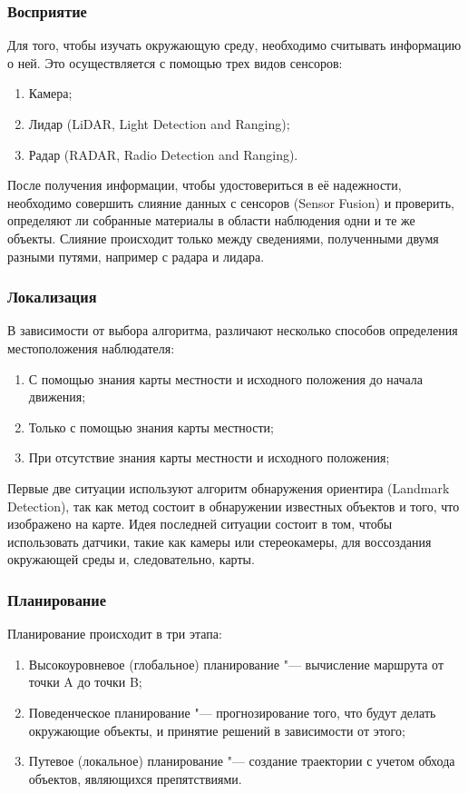 \documentclass[bachelor, och, coursework]{SCWorks}
\begin{document}
        \subsubsection{Восприятие}
            Для того, чтобы изучать окружающую среду, необходимо считывать информацию о ней. Это осуществляется с помощью трех видов сенсоров:
            \begin{enumerate}
                \item Камера;
                \item Лидар (LiDAR, Light Detection and Ranging);
                \item Радар (RADAR, Radio Detection and Ranging).
            \end{enumerate}
            После получения информации, чтобы удостовериться в её надежности, необходимо совершить слияние данных с сенсоров (Sensor Fusion) и проверить, определяют ли собранные материалы в области наблюдения одни и те же объекты. Слияние происходит только между сведениями, полученными двумя разными путями, например с радара и лидара.

        \subsubsection{Локализация}
            В зависимости от выбора алгоритма, различают несколько способов определения местоположения наблюдателя:
            \begin{enumerate}
                \item С помощью знания карты местности и исходного положения до начала движения;
                \item Только с помощью знания карты местности;
                \item При отсутствие знания карты местности и исходного положения;
            \end{enumerate}
            Первые две ситуации используют алгоритм обнаружения ориентира (Landmark Detection), так как метод состоит в обнаружении известных объектов и того, что изображено на карте. Идея последней ситуации состоит в том, чтобы использовать датчики, такие как камеры или стереокамеры, для воссоздания окружающей среды и, следовательно, карты.
    
        \subsubsection{Планирование}
            Планирование происходит в три этапа:
            \begin{enumerate}
                \item Высокоуровневое (глобальное) планирование "--- вычисление маршрута от точки A до точки B;
                \item Поведенческое планирование "--- прогнозирование того, что будут делать окружающие объекты, и принятие решений в зависимости от этого;
                \item Путевое (локальное) планирование "--- создание траектории с учетом обхода объектов, являющихся препятствиями.
            \end{enumerate}
\end{document}
